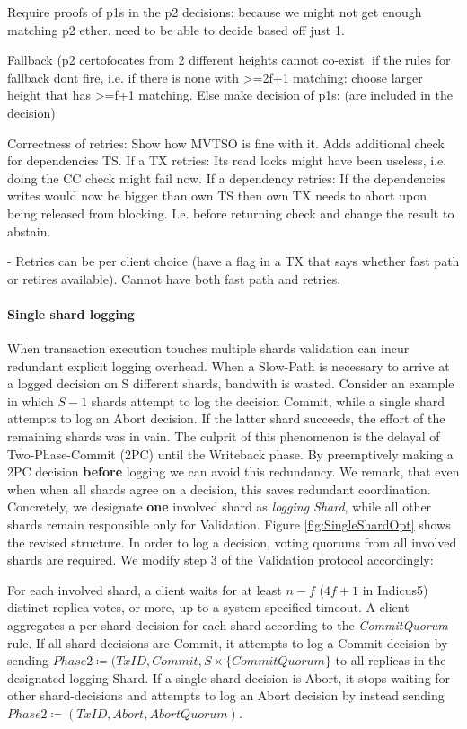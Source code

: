 Require proofs of p1s in the p2 decisions: because we might not get enough matching p2 ether. need to be able to decide based off just 1.

Fallback (p2 certofocates from 2 different heights cannot co-exist. if the rules for fallback dont fire, i.e. if there is none with >=2f+1 matching: choose larger height that has >=f+1 matching. Else make decision of p1s: (are included in the decision)

Correctness of retries: Show how MVTSO is fine with it. Adds additional check for dependencies TS. 
If a TX retries: Its read locks might have been useless, i.e. doing the CC check might fail now. 
If a dependency retries: If the dependencies writes would now be bigger than own TS then own TX needs to abort upon being released from blocking. I.e. before returning check and change the result to abstain.






- Retries can be per client choice (have a flag in a TX that says whether fast path or retires available). Cannot have both fast path and retries.

\paragraph{Single shard logging}
When transaction execution touches multiple shards validation can incur redundant explicit logging overhead. When a Slow-Path is necessary to arrive at a logged decision on S different shards, bandwith is wasted. Consider an example in which $S-1$ shards attempt to log the decision Commit, while a single shard attempts to log an Abort decision. If the latter shard succeeds, the effort of the remaining shards was in vain. 
The culprit of this phenomenon is the delayal of Two-Phase-Commit (2PC) until the Writeback phase. By preemptively making a 2PC decision \textbf{before} logging we can avoid this redundancy. We remark, that even when when all shards agree on a decision, this saves redundant coordination.
Concretely, we designate \textbf{one} involved shard as \textit{logging Shard}, while all other shards remain responsible only for Validation. Figure \ref{fig:SingleShardOpt} shows the revised structure. In order to log a decision, voting quorums from all involved shards are required. We modify step 3 of the Validation protocol accordingly:

For each involved shard, a client waits for at least $n-f$ ($4f+1$ in Indicus5) distinct replica votes, or more, up to a system specified timeout. A client aggregates a per-shard decision for each shard according to the \textit{CommitQuorum} rule. If all shard-decisions are Commit, it attempts to log a Commit decision by sending $Phase2 \coloneqq (TxID, Commit, S \times \{CommitQuorum\}$ to all replicas in the designated logging Shard. If a single shard-decision is Abort, it stops waiting for other shard-decisions and attempts to log an Abort decision by instead sending $Phase2 \coloneqq (TxID, Abort, AbortQuorum)$. 

